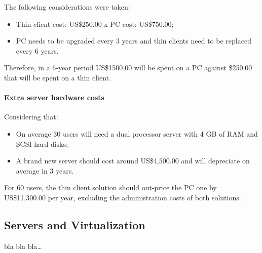                 The following considerations were taken:
                \begin{itemize}
                    \item Thin client cost: US\$250.00 x PC cost: US\$750.00;
                    \item PC needs to be upgraded every 3 years and thin clients need to be replaced every 6 years.
                \end{itemize}
                Therefore, in a 6-year period US\$1500.00 will be spent on a PC against \$250.00 that will be spent on a thin client.

            \paragraph*{Extra server hardware costs}
                Considering that:
                \begin{itemize}
                    \item On average 30 users will need a dual processor server with 4 GB of RAM and SCSI hard disks;
                    \item A brand new server should cost around US\$4,500.00 and will depreciate on average in 3 years.
                \end{itemize}
                For 60 users, the thin client solution should out-price the PC one by US\$11,300.00 per year, excluding the administration costs of both solutions.

        \subsection{Servers and Virtualization} \label{sec2:servers_virtualization}
            bla bla bla\ldots
            
